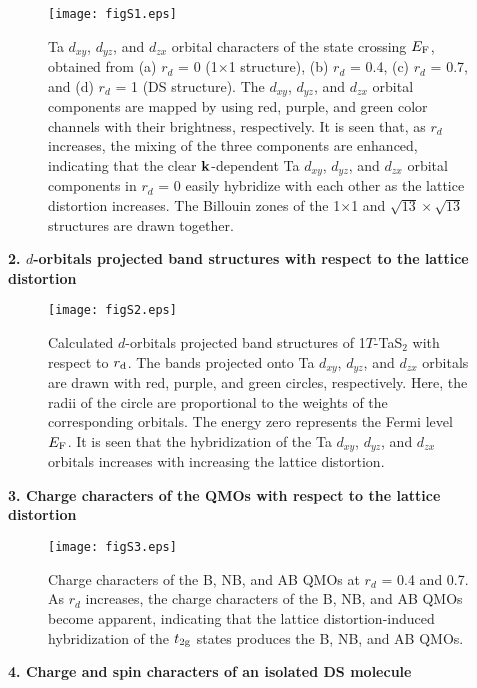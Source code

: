 \documentclass[aps,prl,twocolumn,showpacs,byrevtex]{revtex4}
\begin{document}
\begin{figure}[h]
\texttt{[image: figS1.eps]}
\caption{Ta $d_{xy}$, $d_{yz}$, and $d_{zx}$ orbital characters of the state crossing $E_{\rm F}$, obtained from (a) $r_d$ = 0 (1${\times}$1 structure), (b) $r_d$ = 0.4, (c) $r_d$ = 0.7, and (d) $r_d$ = 1 (DS structure). The $d_{xy}$, $d_{yz}$, and $d_{zx}$ orbital components are mapped by using red, purple, and green color channels with their brightness, respectively. It is seen that, as $r_d$ increases, the mixing of the three components are enhanced, indicating that the clear ${\bf k}$-dependent Ta $d_{xy}$, $d_{yz}$, and $d_{zx}$ orbital components in $r_d$ = 0 easily hybridize with each other as the lattice distortion increases. The Billouin zones of the 1${\times}$1 and ${\sqrt{13}}{\times}{\sqrt{13}}$ structures are drawn together.}
\label{fig:S1}
\end{figure}

\vspace{1.4cm}
{\bf \large 2. $d$-orbitals projected band structures with respect to the lattice distortion}

\begin{figure}[h!b]
\texttt{[image: figS2.eps]}
\caption{Calculated $d$-orbitals projected band structures of 1$T$-TaS$_2$ with respect to $r_{\rm d}$. The bands projected onto Ta $d_{xy}$, $d_{yz}$, and $d_{zx}$ orbitals are drawn with red, purple, and green circles, respectively. Here, the radii of the circle are proportional to the weights of the corresponding orbitals. The energy zero represents the Fermi level $E_{\rm F}$. It is seen that the hybridization of the Ta $d_{xy}$, $d_{yz}$, and $d_{zx}$ orbitals increases with increasing the lattice distortion.}
\label{fig:S2}
\end{figure}

\vspace{1.4cm}
{\bf \large 3. Charge characters of the QMOs with respect to the lattice distortion}

\begin{figure}[h]
\texttt{[image: figS3.eps]}
\caption{Charge characters of the B, NB, and AB QMOs at $r_d$ = 0.4 and 0.7. As $r_d$ increases, the charge characters of the B, NB, and AB QMOs become apparent, indicating that the lattice distortion-induced hybridization of the $t_{\rm 2g}$ states produces the B, NB, and AB QMOs.}
\label{fig:S3}
\end{figure}

\vspace{1.4cm}
{\bf \large 4. Charge and spin characters of an isolated DS molecule}
\end{document}
